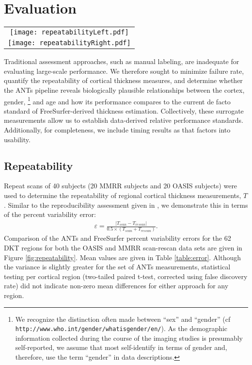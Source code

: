 

\section{Evaluation}

\begin{figure*}[htb]
  \centering
  \begin{tabular}{c}
  \texttt{[image: repeatabilityLeft.pdf]} \\
  \texttt{[image: repeatabilityRight.pdf]}
  \end{tabular}
  \caption{Percent error variability for both ANTs and FreeSurfer pipelines 
           over the left and right hemispheres of both the MMRR and OASIS
           data subsets within the 62 regions defined by the
           Desikan-Killiany-Tourville atlas.  Both methods demonstrate good repeatability
           qualities.
           }
  \label{fig:repeatability}
\end{figure*}


Traditional assessment approaches, such as manual
labeling, are inadequate for evaluating large-scale performance.  
We therefore sought to minimize failure rate, quantify the repeatability of cortical
thickness measures, and
determine whether the ANTs pipeline reveals biologically plausible relationships
between the cortex, gender,%
\footnote{
We recognize the distinction often made between ``sex'' and ``gender'' 
(cf {\tt http://www.who.int/gender/whatisgender/en/}).
As the demographic information collected during the course of the imaging studies 
is presumably self-reported, we assume that most self-identify in terms of 
gender and, therefore, use the term ``gender'' in data
descriptions.
}
and age and how its performance compares
to the current de facto standard of FreeSurfer-derived thickness estimation.
Collectively, these surrogate
measurements allow us to establish data-derived relative performance standards.
Additionally, for completeness, we include timing results as that factors into
usability.

\subsection{Repeatability}%


Repeat scans of 40 subjects (20 MMRR subjects and 20 OASIS subjects) were 
used to determine the repeatability of regional cortical thickness 
measurements, $T$.  Similar to the reproducibility 
assessment given in \cite{jovicich2013}, we
demonstrate this in terms of the percent variability error:
\begin{align}
\varepsilon = \frac{|T_{scan} - T_{rescan}|}{0.5 \times (T_{scan} + T_{rescan})}.
\end{align}
Comparison of the ANTs and FreeSurfer percent variability errors for the 62 DKT 
regions for both the OASIS and MMRR scan-rescan data sets
are given in Figure \ref{fig:repeatability}.  Mean values are given in Table \ref{table:error}.
Although the variance is slightly greater 
for the set of ANTs measurements, statistical testing per cortical region 
(two-tailed paired t-test, corrected using false discovery rate) did not indicate 
non-zero mean differences for either approach for any region.


